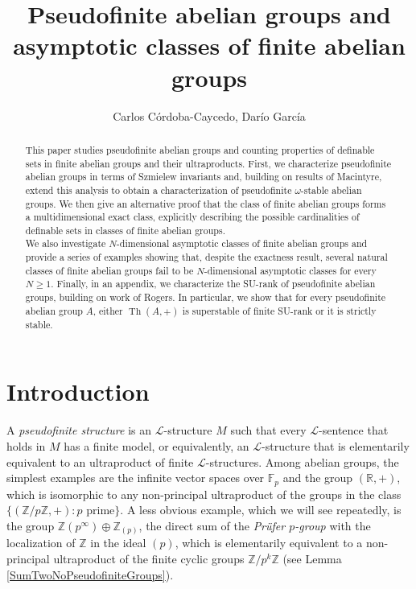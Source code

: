 \documentclass[11pt]{amsart}
\title{Pseudofinite abelian groups and asymptotic classes of finite abelian groups}
\author{Carlos C\'ordoba-Caycedo, Dar\'io Garc\'ia}
\date{}
\theoremstyle{definition}
\newcommand{\Le}{\mathcal{L}}
\begin{document}
\begin{abstract} This paper studies pseudofinite abelian groups and counting properties of definable sets in finite abelian groups and their ultraproducts. First, we characterize pseudofinite abelian groups in terms of Szmielew invariants and, building on results of Macintyre, extend this analysis to obtain a characterization of pseudofinite $\omega$-stable abelian groups. We then give an alternative proof that the class of finite abelian groups forms a multidimensional exact class, explicitly describing the possible cardinalities of definable sets in classes of finite abelian groups.\\

We also investigate $N$-dimensional asymptotic classes of finite abelian groups and provide a series of examples showing that, despite the exactness result, several natural classes of finite abelian groups fail to be $N$-dimensional asymptotic classes for every $N\geq 1$. Finally, in an appendix, we characterize the SU-rank of pseudofinite abelian groups, building on work of Rogers. In particular, we show that for every pseudofinite abelian group $A$, either $\operatorname{Th}(A,+)$ is superstable of finite SU-rank or it is strictly stable.
\end{abstract}

\maketitle
\tableofcontents

\section{Introduction}

A \emph{pseudofinite structure} is an $\Le$-structure $M$ such that every
$\Le$-sentence that holds in $M$ has a finite model, or equivalently, an
$\Le$-structure that is elementarily equivalent to an ultraproduct of finite
$\Le$-structures. Among abelian groups, the simplest examples are the infinite vector
spaces over $\mathbb{F}_p$ and the group $(\mathbb{R},+)$, which is
isomorphic to any non-principal ultraproduct of the groups in the class
$\{(\mathbb{Z}/p\mathbb{Z},+) : p \text{ prime}\}$. A less obvious example,
which we will see repeatedly, is the group
$\mathbb{Z}(p^\infty)\oplus\mathbb{Z}_{(p)}$, the direct sum of the \emph{Prüfer $p$-group} with the localization of $\mathbb{Z}$ in the ideal $(p)$, which is elementarily
equivalent to a non-principal ultraproduct of the finite cyclic groups
$\mathbb{Z}/p^k\mathbb{Z}$ (see Lemma \ref{SumTwoNoPseudofiniteGroups}).\\
\end{document}
